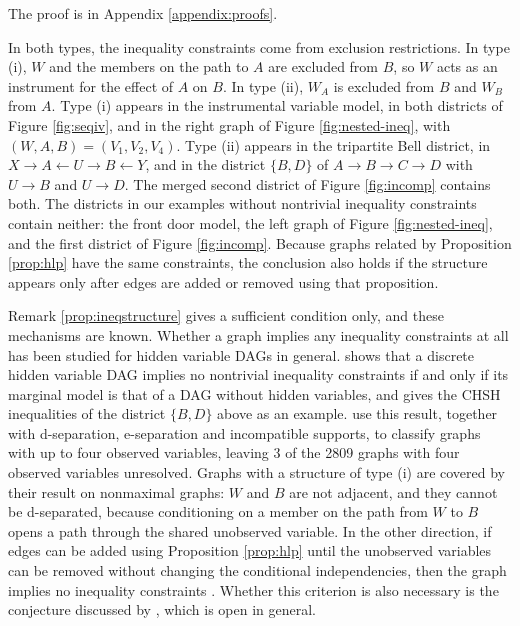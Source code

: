 \documentclass[12pt]{article}
\begin{document}
The proof is in Appendix \ref{appendix:proofs}.

In both types, the inequality constraints come from exclusion restrictions. In type (i), $W$ and the members on the path to $A$ are excluded from $B$, so $W$ acts as an instrument for the effect of $A$ on $B$. In type (ii), $W_A$ is excluded from $B$ and $W_B$ from $A$. Type (i) appears in the instrumental variable model, in both districts of Figure \ref{fig:seqiv}, and in the right graph of Figure \ref{fig:nested-ineq}, with $(W, A, B) = (V_1, V_2, V_4)$. Type (ii) appears in the tripartite Bell district, in $X \rightarrow A \leftarrow U \rightarrow B \leftarrow Y$, and in the district $\{B, D\}$ of $A \rightarrow B \rightarrow C \rightarrow D$ with $U \rightarrow B$ and $U \rightarrow D$. The merged second district of Figure \ref{fig:incomp} contains both. The districts in our examples without nontrivial inequality constraints contain neither: the front door model, the left graph of Figure \ref{fig:nested-ineq}, and the first district of Figure \ref{fig:incomp}. Because graphs related by Proposition \ref{prop:hlp} have the same constraints, the conclusion also holds if the structure appears only after edges are added or removed using that proposition.

Remark \ref{prop:ineqstructure} gives a sufficient condition only, and these mechanisms are known. Whether a graph implies any inequality constraints at all has been studied for hidden variable DAGs in general. \citet{evans2023latent} shows that a discrete hidden variable DAG implies no nontrivial inequality constraints if and only if its marginal model is that of a DAG without hidden variables, and gives the CHSH inequalities of the district $\{B, D\}$ above as an example. \citet{khanna2024classifying} use this result, together with d-separation, e-separation and incompatible supports, to classify graphs with up to four observed variables, leaving 3 of the 2809 graphs with four observed variables unresolved. Graphs with a structure of type (i) are covered by their result on nonmaximal graphs: $W$ and $B$ are not adjacent, and they cannot be d-separated, because conditioning on a member on the path from $W$ to $B$ opens a path through the shared unobserved variable. In the other direction, if edges can be added using Proposition \ref{prop:hlp} until the unobserved variables can be removed without changing the conditional independencies, then the graph implies no inequality constraints \citep{henson2014theory}. Whether this criterion is also necessary is the conjecture discussed by \citet{khanna2024classifying}, which is open in general.
\end{document}
